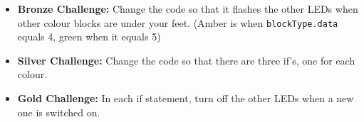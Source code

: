 \documentclass{geocraft-worksheet}
\begin{document}
\begin{itemize}
\item\textbf{Bronze Challenge:} Change the code so that it flashes the other LEDs when other colour blocks are under
  your feet. (Amber is when \lstinline{blockType.data} equals 4, green when it equals 5)\vspace{-0.1cm}

\item\textbf{Silver Challenge:} Change the code so that there are three if's, one for each colour.\vspace{-0.1cm}

\item\textbf{Gold Challenge:} In each if statement, turn off the other LEDs when a new one is switched on.\vspace{-0.1cm}

\end{itemize}
\end{document}
